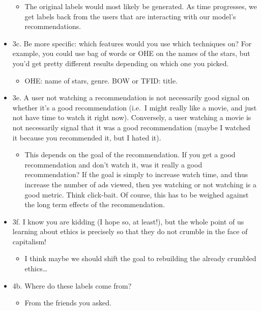 \documentclass[letterpaper]{article}
\begin{document}
\begin{itemize}
\begin{itemize}
\item The original labels would most likely be generated. As time
progresses, we get labels back from the users that are interacting
with our model's recommendations.
\end{itemize}

\item 3c. Be more specific: which features would you use which techniques
on? For example, you could use bag of words or OHE on the names of the
stars, but you'd get pretty different results depending on which one
you picked.

\begin{itemize}
\item OHE: name of stars, genre. BOW or TFID: title.
\end{itemize}

\item 3e. A user not watching a recommendation is not necessarily good
signal on whether it's a good recommendation (i.e. I might really like
a movie, and just not have time to watch it right now). Conversely, a
user watching a movie is not necessarily signal that it was a good
recommendation (maybe I watched it because you recommended it, but I
hated it).

\begin{itemize}
\item This depends on the goal of the recommendation. If you get a good
recommendation and don't watch it, was it really a good
recommendation? If the goal is simply to increase watch time, and
thus increase the number of ads viewed, then yes watching or not
watching is a good metric. Think click-bait. Of course, this has to
be weighed against the long term effects of the recommendation.
\end{itemize}

\item 3f. I know you are kidding (I hope so, at least!), but the whole point
of us learning about ethics is precisely so that they do not crumble
in the face of capitalism!

\begin{itemize}
\item I think maybe we should shift the goal to rebuilding the already
crumbled ethics\ldots{}
\end{itemize}

\item 4b. Where do these labels come from?

\begin{itemize}
\item From the friends you asked.
\end{itemize}


\end{itemize}
\end{document}
